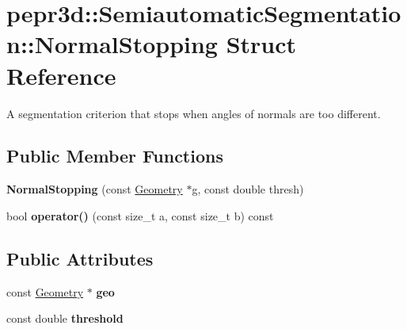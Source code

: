 \hypertarget{structpepr3d_1_1_semiautomatic_segmentation_1_1_normal_stopping}{}\section{pepr3d\+::Semiautomatic\+Segmentation\+::Normal\+Stopping Struct Reference}
\label{structpepr3d_1_1_semiautomatic_segmentation_1_1_normal_stopping}


A segmentation criterion that stops when angles of normals are too different.  


\subsection*{Public Member Functions}
\begin{DoxyCompactItemize}
\item 
\mbox{\label{structpepr3d_1_1_semiautomatic_segmentation_1_1_normal_stopping_a725367fe48e8877e92b84e478dc4609f}} 
{\bfseries Normal\+Stopping} (const \mbox{\hyperlink{classpepr3d_1_1_geometry}{Geometry}} $\ast$g, const double thresh)
\item 
\mbox{\label{structpepr3d_1_1_semiautomatic_segmentation_1_1_normal_stopping_a3c70191daf3fba43f9d76c4eaa8837bb}} 
bool {\bfseries operator()} (const size\+\_\+t a, const size\+\_\+t b) const
\end{DoxyCompactItemize}
\subsection*{Public Attributes}
\begin{DoxyCompactItemize}
\item 
\mbox{\label{structpepr3d_1_1_semiautomatic_segmentation_1_1_normal_stopping_a86816219b14ac1b44d4abacc188d8673}} 
const \mbox{\hyperlink{classpepr3d_1_1_geometry}{Geometry}} $\ast$ {\bfseries geo}
\item 
\mbox{\label{structpepr3d_1_1_semiautomatic_segmentation_1_1_normal_stopping_a194134abb7e778168aaf77a7f4b36c7c}} 
const double {\bfseries threshold}
\end{DoxyCompactItemize}


